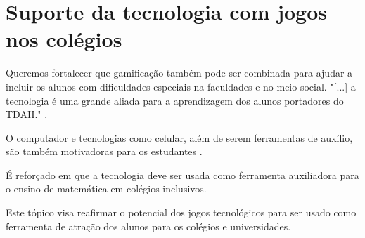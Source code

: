 \section[Suporte da tecnologia com jogos nos colégios]{Suporte da tecnologia com jogos nos colégios}
Queremos fortalecer que gamificação também pode ser combinada para ajudar a incluir os alunos com dificuldades especiais na faculdades e no meio social. "[...] a tecnologia é uma grande aliada para a aprendizagem dos alunos portadores do TDAH."  \cite{matEtdah1}.

O computador e tecnologias como celular, além de serem ferramentas de auxílio, são também  motivadoras para os estudantes \cite{softwaregamificado}.

É reforçado em \cite{revbibmatgam} que a tecnologia deve ser usada como ferramenta auxiliadora para o ensino de matemática em colégios inclusivos.

Este tópico visa reafirmar o potencial dos jogos tecnológicos para ser usado como ferramenta de atração dos alunos para os colégios e universidades.